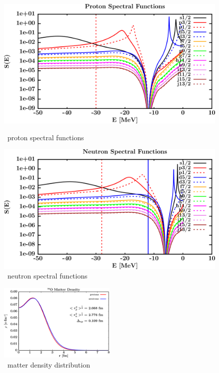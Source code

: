 \begin{figure}[H]
    \centering
    \begin{minipage}{0.45\textwidth}
        \centering
        \includegraphics[width=1.0\textwidth]{figures/o18_protonSpectralFunctions.png}
        \caption{\oEight\ proton spectral functions}
        \label{DOMFitData_o18_proton_spectralFunctions}
    \end{minipage}\hfill
    \begin{minipage}{0.45\textwidth}
        \centering
        \includegraphics[width=1.0\textwidth]{figures/o18_neutronSpectralFunctions.png}
        \caption{\oEight\ neutron spectral functions}
        \label{DOMFitData_o18_neutron_spectralFunctions}
    \end{minipage}
\end{figure}

\begin{figure}[H]
    \centering
    \includegraphics[width = 0.5\textwidth]{figures/o18_matterDensity.png}
    \caption{\oEight\ matter density distribution}
    \label{DOMFitData_o18_matterDensity}
\end{figure}

